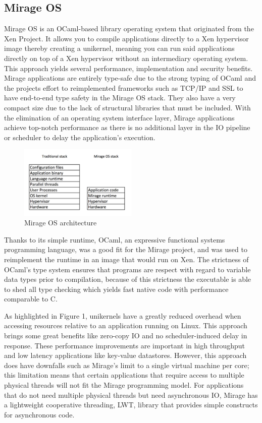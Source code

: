 \documentclass[english,10pt,twocolumn]{article}
\begin{document}
\subsection{Mirage OS}

Mirage OS is an OCaml-based library operating system that originated from the Xen Project.
It allows you to compile applications directly to a Xen hypervisor image thereby creating a unikernel, meaning you can run said applications directly on top of a Xen hypervisor without an intermediary operating system.
This approach yields several performance, implementation and security benefits.
Mirage applications are entirely type-safe due to the strong typing of OCaml and the projects effort to reimplemented frameworks such as TCP/IP and SSL to have end-to-end type safety in the Mirage OS stack.
They also have a very compact size due to the lack of structural libraries that must be included.
With the elimination of an operating system interface layer, Mirage applications achieve top-notch performance as there is no additional layer in the IO pipeline or scheduler to delay the application's execution.

\begin{figure}[ht]
  \centering
  \caption{Mirage OS architecture}
  \includegraphics[width=0.5\textwidth]{images/design}
\end{figure}

Thanks to its simple runtime, OCaml, an expressive functional systems programming language, was a good fit for the Mirage project, and was used to re\-implement the runtime in an image that would run on Xen.
The strictness of OCaml's type system ensures that programs are respect with regard to variable data types prior to compilation, because of this strictness the executable is able to shed all type checking which yields fast native code with performance comparable to C.

As highlighted in Figure 1, unikernels have a greatly reduced overhead when accessing resources relative to an application running on Linux.
This approach brings some great benefits like zero-copy IO and no scheduler-induced delay in response.
These performance improvements are important in high throughput and low latency applications like key-value datastores.
However, this approach does have downfalls such as Mirage's limit to a single virtual machine per core; this limitation means that certain applications that require access to multiple physical threads will not fit the Mirage programming model.
For applications that do not need multiple physical threads but need asynchronous IO, Mirage has a lightweight cooperative threading, LWT, library that provides simple constructs for asynchronous code.
\end{document}
